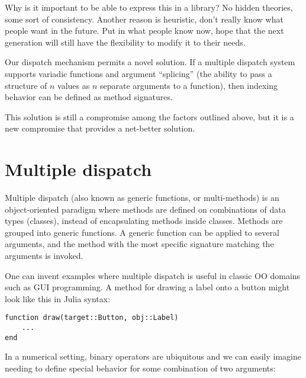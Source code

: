 \documentclass[preprint]{sigplanconf}
\begin{document}

Why is it important to be able to express this in a library? No hidden
theories, some sort of consistency. Another reason is heuristic, don't really
know what people want in the future. Put in what people know now, hope that
the next generation will still have the flexibility to modify it to their
needs.

Our dispatch mechanism permits a novel solution. If a multiple dispatch system
supports variadic functions and argument ``splicing'' (the ability to pass a
structure of $n$ values as $n$ separate arguments to a function), then
indexing behavior can be defined as method signatures.

This solution is still a compromise among the factors outlined above, but it
is a new compromise that provides a net-better solution.


\section{Multiple dispatch}

Multiple dispatch (also known as generic functions, or multi-methods) is an
object-oriented paradigm where methods are defined on combinations of data
types (classes), instead of encapsulating methods inside classes. Methods are
grouped into generic functions. A generic function can be applied to several
arguments, and the method with the most specific signature matching the
arguments is invoked.

One can invent examples where multiple dispatch is useful in classic OO domains
such as GUI programming. A method for drawing a label onto a button might
look like this in Julia syntax:

\begin{verbatim}
function draw(target::Button, obj::Label)
    ...
end
\end{verbatim}

In a numerical setting, binary operators are ubiquitous and we can easily imagine
needing to define special behavior for some combination of two arguments:
\end{document}
